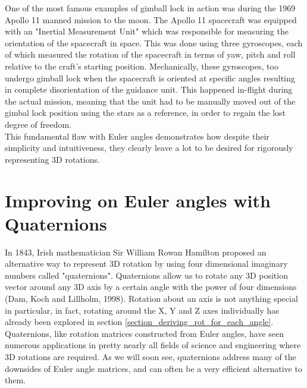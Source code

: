 \documentclass[12pt, a4paper]{article}
\begin{document}
One of the most famous examples of gimball lock in action was during the 1969
Apollo 11 manned mission to the moon. The Apollo 11 spacecraft was equipped with
an "Inertial Measurement Unit" which was responsible for measuring the
orientation of the spacecraft in space. This was done using three gyroscopes,
each of which measured the rotation of the spacecraft in terms of yaw, pitch and
roll relative to the craft's starting position. Mechanically, these gyroscopes,
too undergo gimball lock when the spacecraft is oriented at specific angles
resulting in complete disorientation of the guidance unit. This happened
in-flight during the actual mission, meaning that the unit had to be manually
moved out of the gimbal lock position using the stars as a reference, in order
to regain the lost degree of freedom. \\

This fundamental flaw with Euler angles demonstrates how despite their
simplicity and intuitiveness, they clearly leave a lot to be desired for
rigorously representing 3D rotations. \\


\section{Improving on Euler angles with Quaternions}
In 1843, Irish mathematician Sir William Rowan Hamilton proposed an alternative
way to represent 3D rotation by using four dimensional imaginary numbers called
"quaternions". Quaternions allow us to rotate any 3D position vector around any
3D axis by a certain angle with the power of four dimensions (Dam, Koch and
Lillholm, 1998). Rotation about an axis is not anything special in particular,
in fact, rotating around the X, Y and Z axes individually has already been
explored in section \ref{section_deriving_rot_for_each_angle}. \\

Quaternions, like rotation matrices constructed from Euler angles, have seen
numerous applications in pretty nearly all fields of science and engineering
where 3D rotations are required. As we will soon see, quaternions address many
of the downsides of Euler angle matrices, and can often be a very efficient
alternative to them.
\end{document}
